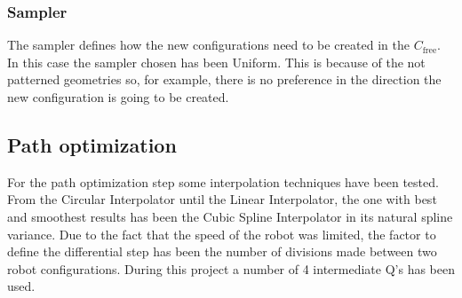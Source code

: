 	\subsubsection{Sampler} %
	\label{sub:sampler}
	The sampler defines how the new configurations need to be created in the $C_{\mathrm{free}}$. In this case the sampler chosen has been Uniform. This is because of the not patterned geometries so, for example, there is no preference in the direction the new configuration is going to be created.
\subsection{Path optimization} %
\label{sub:path_optimization_implementation}
For the path optimization step some interpolation techniques have been tested.
From the Circular Interpolator until the Linear Interpolator, the one with best and smoothest results has been the Cubic Spline Interpolator in its natural spline variance.
Due to the fact that the speed of the robot was limited, the factor to define the differential step has been the number of divisions made between two robot configurations.
During this project a number of 4 intermediate Q's has been used.
